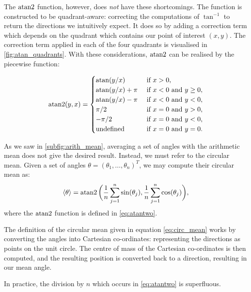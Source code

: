 The $\operatorname{atan2}$ function, however, does \emph{not} have these shortcomings. The function is
constructed to be quadrant-aware: correcting the computations of $\tan^{-1}$ to return the
directions we intuitively expect. It does so by adding a correction term which depends
on the quadrant which contains our point of interest $(x, y)$. The correction term applied
in each of the four quadrants is visualised in \cref{fig:atan_quadrants}. With these
considerations, $\operatorname{atan2}$ can be realised by the piecewise function:

\begin{equation}
\label{eq:atantwo}
	\atantwo(y, x) = 
	\begin{cases}
		\atan(y/x)          & \text{ if } x > 0, \\
		\atan(y/x) + \pi    & \text{ if } x < 0 \text{ and } y \geq 0, \\
		\atan(y/x) - \pi    & \text{ if } x < 0 \text{ and } y < 0, \\
		\pi/2               & \text{ if } x = 0 \text{ and } y > 0, \\
		-\pi/2              & \text{ if } x = 0 \text{ and } y < 0, \\
		\text{undefined}    & \text{ if } x = 0 \text{ and } y = 0. \\
	\end{cases}
\end{equation}

As we saw in \cref{subfig:arith_mean}, averaging a set of angles with the arithmetic mean
does not give the desired result. Instead, we must refer to the circular mean. Given a set
of angles $\theta = (\theta_1, \ldots, \theta_n)^T$, we may compute their circular mean
as:
\begin{equation}
	\label{eq:circ_mean}
	\langle \theta \rangle = \operatorname{atan2}\bigg(\frac{1}{n} \sum_{j=1}^n \sin(\theta_j), \frac{1}{n} 
    \sum_{j=1}^n \cos(\theta_j)\bigg),
\end{equation}
where the $\operatorname{atan2}$ function is defined in \cref{eq:atantwo}.

The definition of the circular mean given in equation \cref{eq:circ_mean} works by
converting the angles into Cartesian co-ordinates: representing the directions as
points on the unit circle. The centre of mass of the Cartesian co-ordinates is then
computed, and the resulting position is converted back to a direction, resulting in our
mean angle.

In practice, the division by $n$ which occurs in \cref{eq:atantwo} is superfluous.
